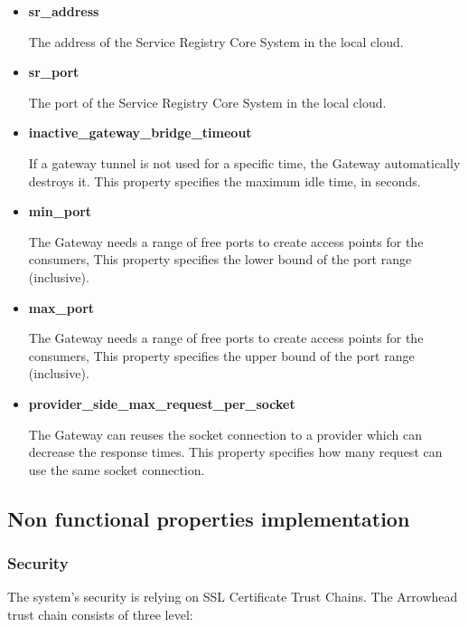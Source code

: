 \documentclass[a4paper]{arrowhead}
\begin{document}
\begin{itemize}
    \item \textbf{sr\_address}
  
    The address of the Service Registry Core System in the local cloud.
    
    \item \textbf{sr\_port}
  
    The port of the Service Registry Core System in the local cloud.
    
    \item \textbf{inactive\_gateway\_bridge\_timeout}
  
    If a gateway tunnel is not used for a specific time, the Gateway automatically destroys it. This property specifies the maximum idle time, in seconds.
          
    \item \textbf{min\_port}
  
    The Gateway needs a range of free ports to create access points for the consumers, This property specifies the lower bound of the port range (inclusive).
    
    \item \textbf{max\_port}
  
    The Gateway needs a range of free ports to create access points for the consumers, This property specifies the upper bound of the port range (inclusive).
    
    \item \textbf{provider\_side\_max\_request\_per\_socket}

    The Gateway can reuses the socket connection to a provider which can decrease the response times. This property specifies how many request can use the same socket connection. 
        
\end{itemize}

\clearpage

\subsection {Non functional properties implementation}

\subsubsection {Security}

The system's security is relying on SSL Certificate Trust Chains. The Arrowhead trust chain consists of three level:
\end{document}
